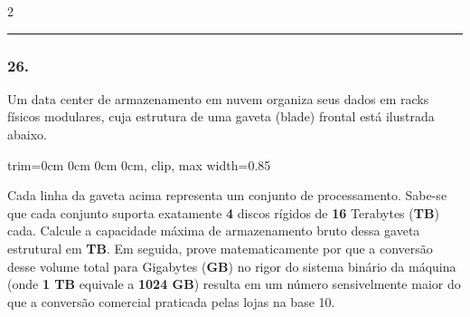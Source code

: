 \documentclass[twoside, 10pt, a4paper]{article}
\newlength{\espacoPreQuestao}\setlength{\espacoPreQuestao}{0.1cm}
\newlength{\espacoQuestao}\setlength{\espacoQuestao}{0.2cm}
\newcommand{\larguraTikz}{0.85\linewidth}
\begin{document}
\begin{multicols*}{2}
\noindent\textcolor{CorLinha}{\rule{\linewidth}{0.5pt}} 
\par\vspace{\espacoPreQuestao}
\subsubsection*{26.} Um data center de armazenamento em nuvem organiza seus dados em racks físicos modulares, cuja estrutura de uma gaveta (blade) frontal está ilustrada abaixo.
\begin{center}
\begin{adjustbox}{trim=0cm 0cm 0cm 0cm, clip, max width=\larguraTikz}
\end{adjustbox}
\end{center}
Cada linha da gaveta acima representa um conjunto de processamento. Sabe-se que cada conjunto suporta exatamente \textbf{4} discos rígidos de \textbf{16} Terabytes (\textbf{TB}) cada. Calcule a capacidade máxima de armazenamento bruto dessa gaveta estrutural em \textbf{TB}. Em seguida, prove matematicamente por que a conversão desse volume total para Gigabytes (\textbf{GB}) no rigor do sistema binário da máquina (onde \textbf{1 TB} equivale a \textbf{1024 GB}) resulta em um número sensivelmente maior do que a conversão comercial praticada pelas lojas na base 10.
\par\vspace{\espacoQuestao}


\end{multicols*}
\end{document}
